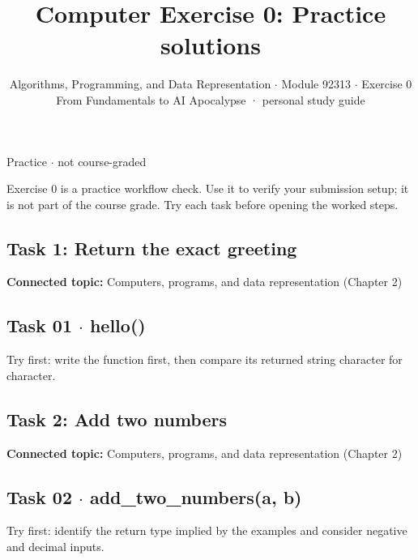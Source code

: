 \documentclass[11pt]{article}
\title{\sffamily\bfseries\color{FAUblue}Computer Exercise 0: Practice solutions}
\author{Algorithms, Programming, and Data Representation \ensuremath{\cdot} Module 92313 \ensuremath{\cdot} Exercise 0\\[2pt]\small From Fundamentals to AI Apocalypse · personal study guide}
\date{}
\begin{document}
\maketitle
\begingroup\footnotesize\setlength{\parskip}{0pt}\tableofcontents\endgroup
\clearpage

Practice \ensuremath{\cdot} not course-graded

{\large Exercise 0 is a practice workflow check. Use it to verify your submission setup; it is not part of the course grade. Try each task before opening the worked steps.}


\begin{keepsection}
\section{Task 1: Return the exact greeting}

\textbf{Connected topic:} Computers, programs, and data representation (Chapter 2)

\begin{keepsection}
\subsection{Task 01 \ensuremath{\cdot} hello()}

Try first: write the function first, then compare its returned string character for character.

\end{keepsection}
\end{keepsection}

\begin{keepsection}
\section{Task 2: Add two numbers}

\textbf{Connected topic:} Computers, programs, and data representation (Chapter 2)

\begin{keepsection}
\subsection{Task 02 \ensuremath{\cdot} add\_two\_numbers(a, b)}

Try first: identify the return type implied by the examples and consider negative and decimal inputs.

\end{keepsection}
\end{keepsection}
\end{document}
